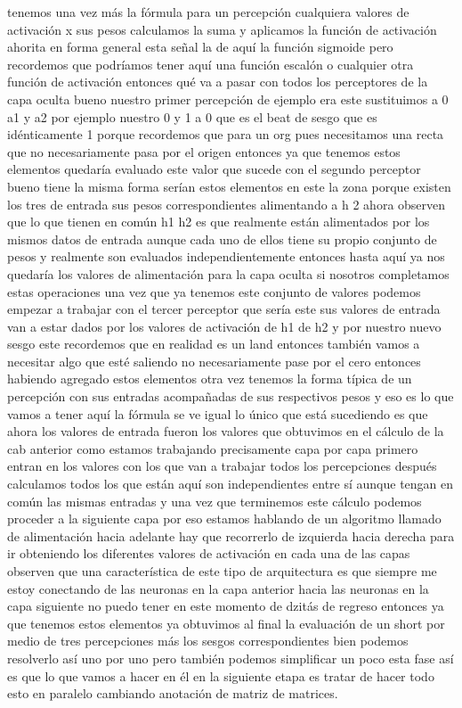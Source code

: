 tenemos una vez más la fórmula para un percepción cualquiera valores de activación x sus pesos calculamos la suma y aplicamos la función de activación ahorita en forma general esta señal la de aquí la función sigmoide pero recordemos que podríamos tener aquí una función escalón o cualquier otra función de activación entonces qué va a pasar con todos los perceptores de la capa oculta bueno nuestro primer percepción de ejemplo era este sustituimos a 0 a1 y a2 por ejemplo nuestro 0 y 1 a 0 que es el beat de sesgo que es idénticamente 1 porque recordemos que para un org pues necesitamos una recta que no necesariamente pasa por el origen entonces ya que tenemos estos elementos quedaría evaluado este valor que sucede con el segundo perceptor bueno tiene la misma forma serían estos elementos en este la zona porque existen los tres de entrada sus pesos correspondientes alimentando a h 2 ahora observen que lo que tienen en común h1 h2 es que realmente están alimentados por los mismos datos de entrada aunque cada uno de ellos tiene su propio conjunto de pesos y realmente son evaluados independientemente entonces hasta aquí ya nos quedaría los valores de alimentación para la capa oculta si nosotros completamos estas operaciones una vez que ya tenemos este conjunto de valores podemos empezar a trabajar con el tercer perceptor que sería este sus valores de entrada van a estar dados por los valores de activación de h1 de h2 y por nuestro nuevo sesgo este recordemos que en realidad es un land entonces también vamos a necesitar algo que esté saliendo no necesariamente pase por el cero entonces habiendo agregado estos elementos otra vez tenemos la forma típica de un percepción con sus entradas acompañadas de sus respectivos pesos y eso es lo que vamos a tener aquí la fórmula se ve igual lo único que está sucediendo es que ahora los valores de entrada fueron los valores que obtuvimos en el cálculo de la cab anterior como estamos trabajando precisamente capa por capa primero entran en los valores con los que van a trabajar todos los percepciones después calculamos todos los que están aquí son independientes entre sí aunque tengan en común las mismas entradas y una vez que terminemos este cálculo podemos proceder a la siguiente capa por eso estamos hablando de un algoritmo llamado de alimentación hacia adelante hay que recorrerlo de izquierda hacia derecha para ir obteniendo los diferentes valores de activación en cada una de las capas observen que una característica de este tipo de arquitectura es que siempre me estoy conectando de las neuronas en la capa anterior hacia las neuronas en la capa siguiente no puedo tener en este momento de dzitás de regreso entonces ya que tenemos estos elementos ya obtuvimos al final la evaluación de un short por medio de tres percepciones más los sesgos correspondientes bien podemos resolverlo así uno por uno pero también podemos simplificar un poco esta fase así es que lo que vamos a hacer en él en la siguiente etapa es tratar de hacer todo esto en paralelo cambiando anotación de matriz de matrices.
